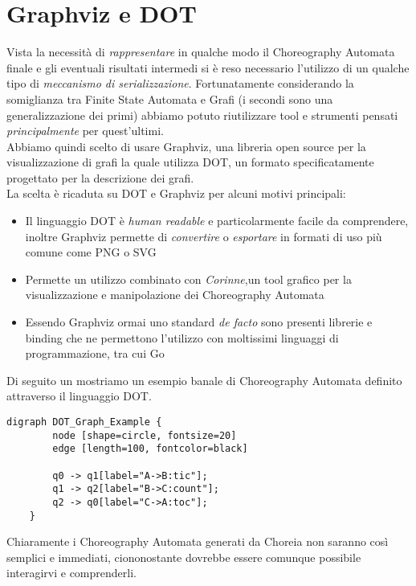 \section{Graphviz e DOT}
Vista la necessità di \emph{rappresentare} in qualche modo il Choreography Automata finale e gli eventuali risultati intermedi si è reso necessario l'utilizzo di un qualche tipo di \emph{meccanismo di serializzazione}. Fortunatamente considerando la somiglianza tra Finite State Automata e Grafi (i secondi sono una generalizzazione dei primi) abbiamo potuto riutilizzare tool e strumenti pensati \emph{principalmente} per quest'ultimi.\\
Abbiamo quindi scelto di usare Graphviz\cite{Graphviz_Wikipedia}, una libreria open source per la visualizzazione di grafi la quale utilizza DOT\cite{DOT_Wikipedia}, un formato specificatamente progettato per la descrizione dei grafi.\\
La scelta è ricaduta su DOT e Graphviz per alcuni motivi principali:
\begin{itemize}
    \item Il linguaggio DOT è \emph{human readable} e particolarmente facile da comprendere, inoltre Graphviz permette di \emph{convertire} o \emph{esportare} in formati di uso più comune come PNG o SVG
    \item Permette un utilizzo combinato con \emph{Corinne}\cite{Corinne},un tool grafico per la visualizzazione e manipolazione dei Choreography Automata
    \item Essendo Graphviz ormai uno standard \emph{de facto} sono presenti librerie e binding che ne permettono l'utilizzo con moltissimi linguaggi di programmazione, tra cui Go
\end{itemize}
Di seguito un mostriamo un esempio banale di Choreography Automata definito attraverso il linguaggio DOT.
\begin{lstlisting}[caption=Rappresentazione in DOT dell'automa in figura \ref{fig:ChoreographyAutomata_Example}]
    digraph DOT_Graph_Example {
        node [shape=circle, fontsize=20]
        edge [length=100, fontcolor=black]
      
        q0 -> q1[label="A->B:tic"];
        q1 -> q2[label="B->C:count"];
        q2 -> q0[label="C->A:toc"];
    }
\end{lstlisting}
Chiaramente i Choreography Automata generati da Choreia non saranno così semplici e immediati, ciononostante dovrebbe essere comunque possibile interagirvi e comprenderli.